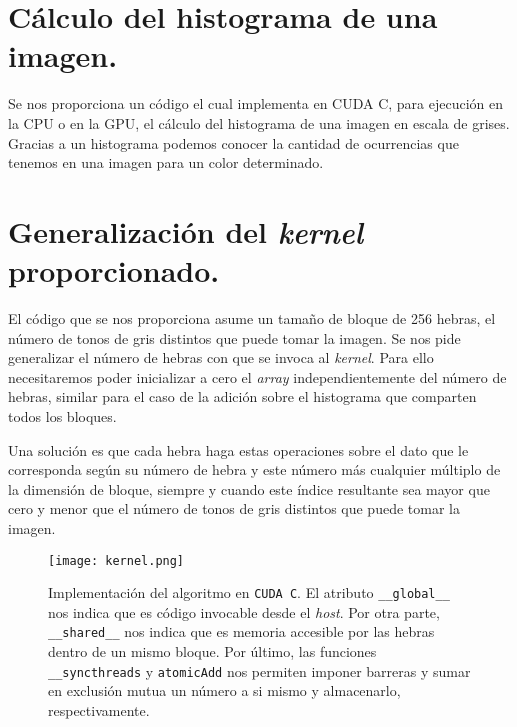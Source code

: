 \section{Cálculo del histograma de una imagen.}

Se nos proporciona un código el cual implementa en CUDA C, para ejecución en la CPU o en la GPU,
el cálculo del histograma de una imagen en escala de grises. Gracias a un histograma podemos
conocer la cantidad de ocurrencias que tenemos en una imagen para un color determinado.

\section{Generalización del \textit{kernel} proporcionado.}

El código que se nos proporciona asume un tamaño de bloque de 256 hebras, el número de tonos de
gris distintos que puede tomar la imagen. Se nos pide generalizar el número de hebras con que se
invoca al \textit{kernel}. Para ello necesitaremos poder inicializar a cero el \textit{array}
independientemente del número de hebras, similar para el caso de la adición sobre el histograma
que comparten todos los bloques.

Una solución es que cada hebra haga estas operaciones sobre el
dato que le corresponda según su número de hebra y este número más cualquier múltiplo de la dimensión
de bloque, siempre y cuando este índice resultante sea mayor que cero y menor que el número de tonos
de gris distintos que puede tomar la imagen.

\begin{figure}[H]
    \centering
    \texttt{[image: kernel.png]}
    \caption{Implementación del algoritmo en \texttt{CUDA C}. El atributo \texttt{\_\_global\_\_} nos indica que es código invocable
    desde el \textit{host}. Por otra parte, \texttt{\_\_shared\_\_} nos indica que es memoria accesible por las hebras dentro de un
    mismo bloque. Por último, las funciones \texttt{\_\_syncthreads} y \texttt{atomicAdd} nos permiten imponer barreras y sumar
    en exclusión mutua un número a si mismo y almacenarlo, respectivamente.}
\end{figure}

